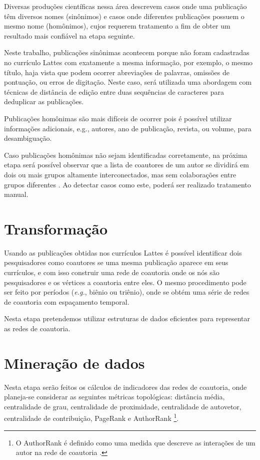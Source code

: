 Diversas produções científicas nessa área \cite{franceschet2011collaboration} \cite{mena2013prospecccao} \cite{reuther2006managing} descrevem casos onde uma publicação têm diversos nomes (sinônimos) e casos onde diferentes publicações possuem o mesmo nome (homônimos), cujos requerem tratamento a fim de obter um resultado mais confiável na etapa seguinte.

Neste trabalho, publicações sinônimas acontecem porque não foram cadastradas no currículo Lattes com exatamente a mesma informação, por exemplo, o mesmo título, haja vista que podem ocorrer abreviações de palavras, omissões de pontuação, ou erros de digitação. Neste caso, será utilizada uma abordagem com técnicas de distância de edição entre duas sequências de caracteres para deduplicar as publicações.

Publicações homônimas são mais difíceis de ocorrer pois é possível utilizar informações adicionais, e.g., autores, ano de publicação, revista, ou volume, para desambiguação.

Caso publicações homônimas não sejam identificadas corretamente, na próxima etapa será possível observar que a lista de coautores de um autor se dividirá em dois ou mais grupos altamente interconectados, mas sem colaborações entre grupos diferentes \cite{franceschet2011collaboration}. Ao detectar casos como este, poderá ser realizado tratamento manual.

\section{Transformação}

Usando as publicações obtidas nos currículos Lattes é possível identificar dois pesquisadores como coautores se uma mesma publicação aparece em seus currículos, e com isso construir uma rede de coautoria onde os nós são pesquisadores e os vértices a coautoria entre eles. O mesmo procedimento pode ser feito por períodos (\textit{e.g.}, biênio ou triênio), onde se obtém uma série de redes de coautoria com espaçamento temporal.

Nesta etapa pretendemos utilizar estruturas de dados eficientes para representar as redes de coautoria.

\section{Mineração de dados}

Nesta etapa serão feitos os cálculos de indicadores das redes de coautoria, onde planeja-se considerar as seguintes métricas topológicas: distância média, centralidade de grau, centralidade de proximidade, centralidade de autovetor, centralidade de contribuição, PageRank e AuthorRank \footnote{O AuthorRank é definido como uma medida que descreve as interações de um autor na rede de coautoria \cite{liu2005co}.}.

